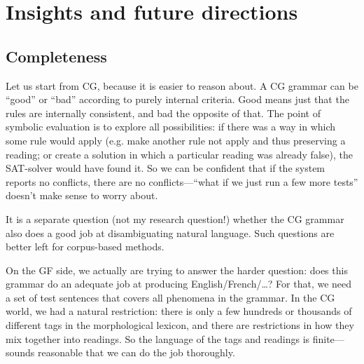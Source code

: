 


\section{Insights and future directions}


\subsection{Completeness}

Let us start from CG, because it is easier to reason about. A CG
grammar can be “good” or “bad” according to purely internal
criteria. Good means just that the rules are internally consistent,
and bad the opposite of that. The point of symbolic evaluation is to
explore all possibilities: if there was a way in which some rule would
apply (e.g. make another rule not apply and thus preserving a reading;
or create a solution in which a particular reading was already false),
the SAT-solver would have found it. So we can be confident that if the
system reports no conflicts, there are no conflicts---``what if we
just run a few more tests'' doesn’t make sense to worry about.

It is a separate question (not my research question!) whether the CG
grammar also does a good job at disambiguating natural language. Such
questions are better left for corpus-based methods.

On the GF side, we actually are trying to answer the harder question:
does this grammar do an adequate job at producing
English/French/\dots? For that, we need a set of test sentences that
covers all phenomena in the grammar. In the CG world, we had a natural
restriction: there is only a few hundreds or thousands of different
tags in the morphological lexicon, and there are restrictions in how
they mix together into readings. So the language of the tags and
readings is finite—sounds reasonable that we can do the job
thoroughly.

